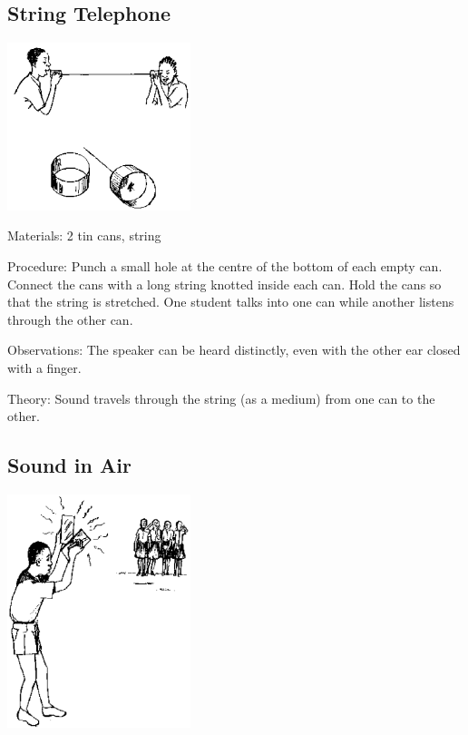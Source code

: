 \begin{multicols}{2}
\subsection{String Telephone}

\begin{center}
\includegraphics[width=0.4\textwidth]{./img/source/string-telephone.png}
\end{center}

\begin{description*}
\item[Materials:]{2 tin cans, string}
\item[Procedure:]{Punch a small hole at the centre of the bottom of each empty can. Connect the cans with a long string knotted inside each can. Hold the cans so that the string is stretched. One student talks into one can while another listens through the other can.}
\item[Observations:]{The speaker can be heard distinctly, even with the other ear closed with a finger.}
\item[Theory:]{Sound travels through the string (as a medium) from one can to the other.}
\end{description*}

\subsection{Sound in Air}

\begin{center}
\includegraphics[width=0.4\textwidth]{./img/source/sound-in-air.png}
\end{center}


\end{multicols}
